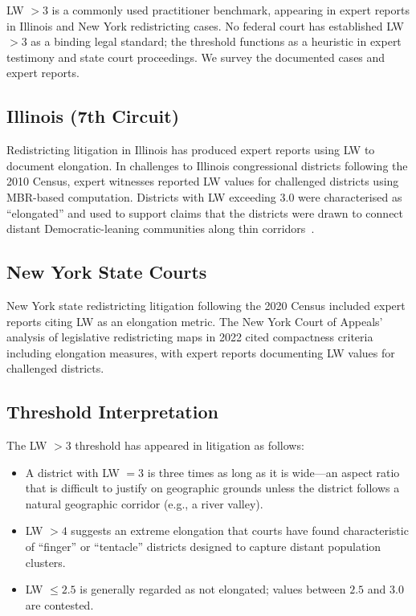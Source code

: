 LW $> 3$ is a commonly used practitioner benchmark, appearing in expert reports in
Illinois and New York redistricting cases.
No federal court has established LW $> 3$ as a binding legal standard;
the threshold functions as a heuristic in expert testimony and state court proceedings.
We survey the documented cases and expert reports.

\subsection{Illinois (7th Circuit)}

Redistricting litigation in Illinois has produced expert reports using LW
to document elongation.
In challenges to Illinois congressional districts following the 2010 Census,
expert witnesses reported LW values for challenged districts using MBR-based
computation.
Districts with LW exceeding 3.0 were characterised as ``elongated'' and
used to support claims that the districts were drawn to connect distant
Democratic-leaning communities along thin corridors~\citep{niemi1990measuring}.

\subsection{New York State Courts}

New York state redistricting litigation following the 2020 Census included
expert reports citing LW as an elongation metric.
The New York Court of Appeals' analysis of legislative redistricting maps
in 2022 cited compactness criteria including elongation measures,
with expert reports documenting LW values for challenged districts.

\subsection{Threshold Interpretation}

The LW $> 3$ threshold has appeared in litigation as follows:
\begin{itemize}
  \item A district with LW $= 3$ is three times as long as it is wide---an
    aspect ratio that is difficult to justify on geographic grounds unless
    the district follows a natural geographic corridor (e.g., a river valley).
  \item LW $> 4$ suggests an extreme elongation that courts have found
    characteristic of ``finger'' or ``tentacle'' districts designed to
    capture distant population clusters.
  \item LW $\leq 2.5$ is generally regarded as not elongated; values between
    $2.5$ and $3.0$ are contested.
\end{itemize}

